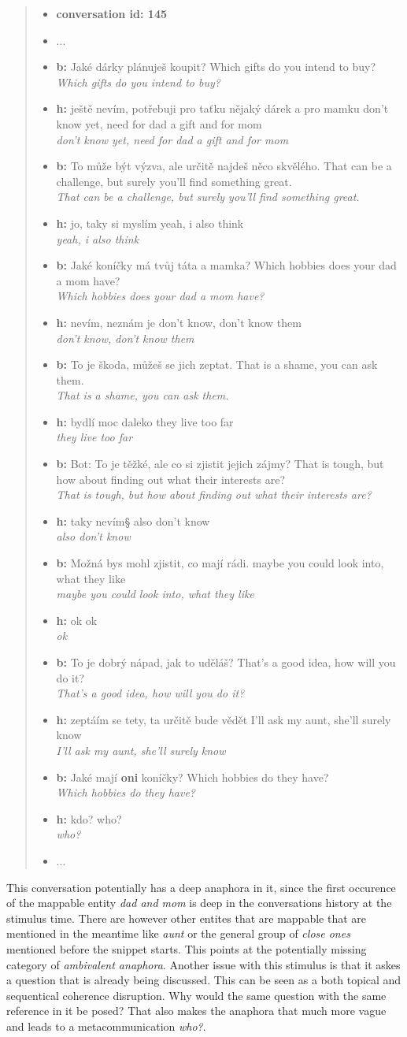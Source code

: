 \documentclass[12pt]{report}
\newcommand{\utterance}[3]{%
    \textbf{#1} #2%
    \ifx\relax#3\relax%
    \else \\ \textit{#3}%
    \fi%
}
\begin{document}
{\begin{quote}
\begin{itemize}[label={}, leftmargin=0pt, itemsep=0.5em]
    \item \textbf{conversation id: 145}
    \item ...
    \item \utterance{b:}{Jaké dárky plánuješ koupit?}{Which gifts do you intend to buy?}
    \item \utterance{h:}{ještě nevím, potřebuji pro taťku nějaký dárek a pro mamku}{don't know yet, need for dad a gift and for mom}
    \item \utterance{b:}{To může být výzva, ale určitě najdeš něco skvělého.}{That can be a challenge, but surely you'll find something great.}
    \item \utterance{h:}{jo, taky si myslím}{yeah, i also think}
    \item \utterance{b:}{Jaké koníčky má tvůj táta a mamka?}{Which hobbies does your dad a mom have?}
    \item \utterance{h:}{nevím, neznám je}{don't know, don't know them}
    \item \utterance{b:}{To je škoda, můžeš se jich zeptat.}{That is a shame, you can ask them.}
    \item \utterance{h:}{bydlí moc daleko}{they live too far}
    \item \utterance{b:}{Bot: To je těžké, ale co si zjistit jejich zájmy?}{That is tough, but how about finding out what their interests are?}
    \item \utterance{h:}{taky nevím§}{also don't know}
    \item \utterance{b:}{Možná bys mohl zjistit, co mají rádi.}{maybe you could look into, what they like}
    \item \utterance{h:}{ok}{ok}
    \item \utterance{b:}{To je dobrý nápad, jak to uděláš?}{That's a good idea, how will you do it?}
    \item \utterance{h:}{zeptáím se tety, ta určitě bude vědět}{I'll ask my aunt, she'll surely know}
    \item \utterance{b:}{Jaké mají \textbf{oni} koníčky?}{Which hobbies do they have?}
    \item \utterance{h:}{kdo?}{who?}
    \item ...
\end{itemize}
\end{quote}

This conversation potentially has a deep anaphora in it,
since the first occurence of the mappable entity \textit{dad and mom} is deep in the conversations history
at the stimulus time.
There are however other entites that are mappable
that are mentioned in the meantime like \textit{aunt}
or the general group of \textit{close ones} mentioned before the snippet starts.
This points at the potentially missing category of \textit{ambivalent anaphora}.
Another issue with this stimulus is that it askes a question that is already being discussed.
This can be seen as a both topical and sequentical coherence disruption.
Why would the same question with the same reference in it be posed?
That also makes the anaphora that much more vague and leads to a metacommunication \textit{who?}.

}
\end{document}
